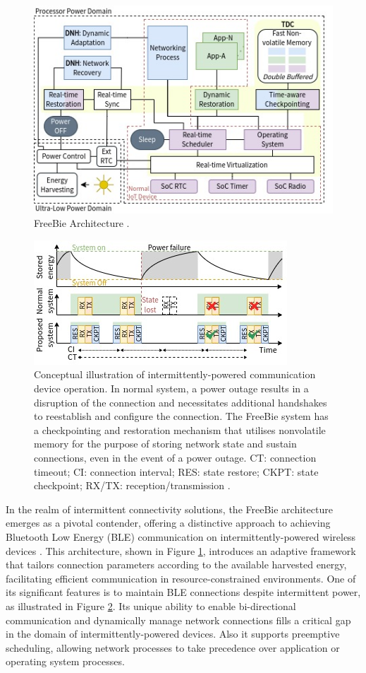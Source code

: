 \begin{figure}[t]
    \centering
    \includegraphics[width=0.6\linewidth]{chapters/Literature/diagram.jpg}
    \caption{FreeBie Architecture \cite{de2022Intermittently}.}
    \label{fig:freebie_paper_arch}
\end{figure}
\begin{figure}[t]
    \centering
    \includegraphics[width=0.6\linewidth]{chapters/Literature/intro.jpg}
    \caption{Conceptual illustration of intermittently-powered communication device operation. In normal system, a power outage results in a disruption of the connection and necessitates additional handshakes to reestablish and configure the connection. The FreeBie system has a checkpointing and restoration mechanism that utilises nonvolatile memory for the purpose of storing network state and sustain connections, even in the event of a power outage. CT: connection timeout; CI: connection interval; RES: state restore; CKPT: state checkpoint; RX/TX: reception/transmission \cite{de2022Intermittently}.}
    \label{fig:freebie_paper_conn}
\end{figure}

In the realm of intermittent connectivity solutions, the FreeBie architecture emerges as a pivotal contender, offering a distinctive approach to achieving Bluetooth Low Energy (BLE) communication on intermittently-powered wireless devices \cite{de2022Intermittently}. This architecture, shown in Figure \ref{fig:freebie_paper_arch}, introduces an adaptive framework that tailors connection parameters according to the available harvested energy, facilitating efficient communication in resource-constrained environments. One of its significant features is to maintain BLE connections despite intermittent power, as illustrated in Figure \ref{fig:freebie_paper_conn}. Its unique ability to enable bi-directional communication and dynamically manage network connections fills a critical gap in the domain of intermittently-powered devices. Also it supports preemptive scheduling, allowing network processes to take precedence over application or operating system processes.
\vspace{1\baselineskip}

